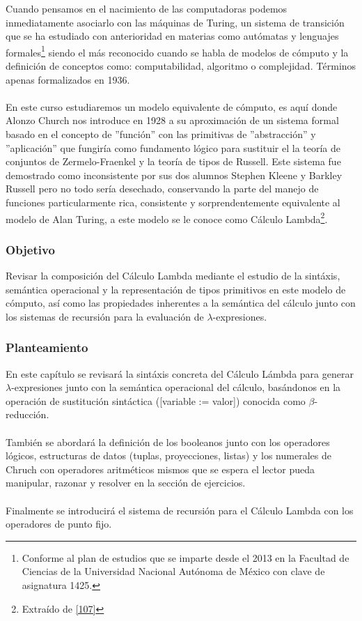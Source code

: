 Cuando pensamos en el nacimiento de las computadoras podemos inmediatamente asociarlo con las máquinas de Turing, un sistema de transición que se ha estudiado con anterioridad en materias como autómatas y lenguajes formales\footnote{Conforme al plan de estudios que se imparte desde el 2013 en la Facultad de Ciencias de la Universidad Nacional Autónoma de México con clave de asignatura 1425. } siendo el más reconocido cuando se habla de modelos de cómputo y la definición de conceptos como: computabilidad, algoritmo o complejidad. Términos apenas formalizados en 1936.\\\\
En este curso estudiaremos un modelo equivalente de cómputo, es aquí donde Alonzo Church nos introduce en 1928 a su aproximación de un sistema formal basado en el concepto de ''función'' con las primitivas de ''abstracción'' y ''aplicación'' que fungiría como fundamento lógico para sustituir el la teoría de conjuntos de Zermelo-Fraenkel y la teoría de tipos de Russell. Este sistema fue demostrado como inconsistente por sus dos alumnos Stephen Kleene y Barkley Russell pero no todo sería desechado, conservando la parte del manejo de funciones particularmente rica, consistente y sorprendentemente equivalente al modelo de Alan Turing, a este modelo se le conoce como Cálculo Lambda\footnote{Extraído de  \hyperlink{107}{[107]}}.\\


\subsubsection{Objetivo}
Revisar la composición del Cálculo Lambda mediante el estudio de la sintáxis, semántica operacional y la representación de tipos primitivos en este modelo de cómputo, así como las propiedades inherentes a la semántica del cálculo junto con los sistemas de recursión para la evaluación de $\lambda$-expresiones. \\ 

\subsubsection{Planteamiento}
En este capítulo se revisará la sintáxis concreta del Cálculo Lámbda para generar $\lambda$-expresiones junto con
la semántica operacional del cálculo, basándonos en la operación de sustitución sintáctica ([variable := valor]) conocida como $\beta$-reducción.\\\\
También se abordará la definición de los booleanos junto con los operadores lógicos, estructuras de datos (tuplas, proyecciones, listas) y los numerales de Chruch con operadores aritméticos mismos que se espera el lector pueda manipular, razonar y resolver en la sección de ejercicios. \\\\
Finalmente se introducirá el sistema de recursión para el Cálculo Lambda con los operadores de punto fijo.


